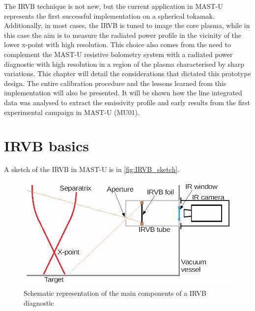 The IRVB technique is not new, but the current application in MAST-U represents the first successful implementation on a spherical tokamak. Additionally, in most cases, the IRVB is tuned to image the core plasma, while in this case the aim is to measure the radiated power profile in the vicinity of the lower x-point with high resolution. This choice also comes from the need to complement the MAST-U resistive bolometry system with a radiated power diagnostic with high resolution in a region of the plasma characterised by sharp variations.
This chapter will detail the considerations that dictated this prototype design. The entire calibration procedure and the lessons learned from this implementation will also be presented. It will be shown how the line integrated data was analysed to extract the emissivity profile and early results from the first experimental campaign in MAST-U (MU01).

\section{IRVB basics}

A sketch of the IRVB in MAST-U is in \autoref{fig:IRVB_sketch}.

\begin{figure}[!ht]
	\centering
	\includegraphics[width=0.7\linewidth]{Chapters/chapter2/figs/IRVB cartoon.png}
	\caption{Schematic representation of the main components of a IRVB diagnostic}
	\label{fig:IRVB_sketch}
\end{figure}

